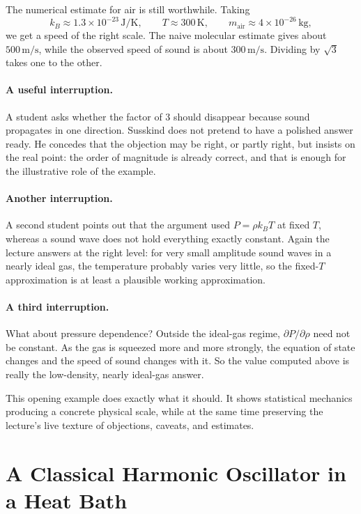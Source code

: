 The numerical estimate for air is still worthwhile. Taking
\begin{equation}
k_B\approx 1.3\times 10^{-23}\,\mathrm{J/K},
\qquad
T\approx 300\,\mathrm{K},
\qquad
m_{\mathrm{air}}\approx 4\times 10^{-26}\,\mathrm{kg},
\end{equation}
we get a speed of the right scale. The naive molecular estimate gives about \(500\,\mathrm{m/s}\), while the observed speed of sound is about \(300\,\mathrm{m/s}\). Dividing by \(\sqrt{3}\) takes one to the other.

\paragraph{A useful interruption.} A student asks whether the factor of \(3\) should disappear because sound propagates in one direction. Susskind does not pretend to have a polished answer ready. He concedes that the objection may be right, or partly right, but insists on the real point: the order of magnitude is already correct, and that is enough for the illustrative role of the example.

\paragraph{Another interruption.} A second student points out that the argument used \(P=\rho k_B T\) at fixed \(T\), whereas a sound wave does not hold everything exactly constant. Again the lecture answers at the right level: for very small amplitude sound waves in a nearly ideal gas, the temperature probably varies very little, so the fixed-\(T\) approximation is at least a plausible working approximation.

\paragraph{A third interruption.} What about pressure dependence? Outside the ideal-gas regime, \(\partial P/\partial \rho\) need not be constant. As the gas is squeezed more and more strongly, the equation of state changes and the speed of sound changes with it. So the value computed above is really the low-density, nearly ideal-gas answer.

This opening example does exactly what it should. It shows statistical mechanics producing a concrete physical scale, while at the same time preserving the lecture's live texture of objections, caveats, and estimates.

\section{A Classical Harmonic Oscillator in a Heat Bath}

